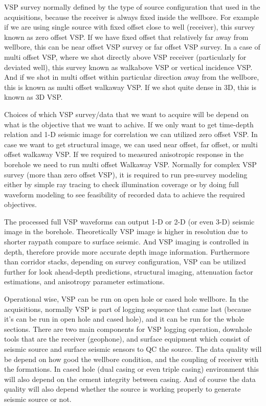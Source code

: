 \documentclass{article}
\begin{document}
\vspace{24pt}
VSP survey normally defined by the type of source configuration that used in the 
acquisitions, because the receiver is always fixed inside the wellbore. For example 
if we are using single source with fixed offset close to well (receiver), this 
survey known as zero offset VSP. If we have fixed offset that relatively far away 
from wellbore, this can be near offset VSP survey or far offset VSP survey. In 
a case of multi offset VSP, where we shot directly above VSP receiver (particularly 
for deviated well), this survey known as walkabove VSP or vertical incidence VSP. 
And if we shot in multi offset within particular direction away from the wellbore, 
this is known as multi offset walkaway VSP. If we shot quite dense in 3D, this 
is known as 3D VSP. 

\vspace{24pt}
Choices of which VSP survey/data that we want to acquire will be depend on what 
is the objective that we want to achive. If we only want to get time-depth relation 
and 1-D seismic image for correlation we can utilized zero offset VSP. In case 
we want to get structural image, we can used near offset, far offset, or multi 
offset walkaway VSP. If we required to measured anisotropic response in the borehole 
we need to run multi offset Walkaway VSP. Normally for complex VSP survey (more 
than zero offset VSP), it is required to run pre-survey modeling either by simple 
ray tracing to check illumination coverage or by doing full waveform modeling to 
see feasibility of recorded data to achieve the required objectives.  

\vspace{24pt}
The processed full VSP waveforms can output 1-D or 2-D (or even 3-D) seismic image 
in the borehole. Theoretically VSP image is higher in resolution due to shorter 
raypath compare to surface seismic. And VSP imaging is controlled in depth, therefore 
provide more accurate depth image information. Furthermore than corridor stacks, 
depending on survey configuration, VSP can be utilized further for look ahead-depth 
predictions, structural imaging, attenuation factor estimations, and anisotropy 
parameter estimations.

\vspace{24pt}
Operational wise, VSP can be run on open hole or cased hole wellbore. In the acquisitions, 
normally VSP is part of logging sequence that came last (because it's can be run 
in open hole and cased hole), and it can be run for the whole sections. There are 
two main components for VSP logging operation, downhole tools that are the receiver 
(geophone), and surface equipment which consist of seismic source and surface seismic 
sensors to QC the source. The data quality will be depend on how good the wellbore 
condition, and the coupling of receiver with the formations.  In cased hole (dual 
casing or even triple casing) environment this will also depend on the cement integrity 
between casing. And of course the data quality will also depend whether the source 
is working properly to generate seismic source or not. 
\end{document}
